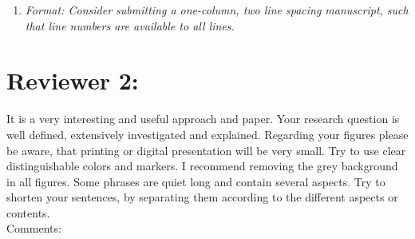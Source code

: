 \documentclass{article}
\begin{document}
\begin{enumerate}
  
  
    \answer{}
  
  \item \textit{Format: Consider submitting a one-column, two line spacing manuscript, such that line numbers are available to all lines.}
  
   
\end{enumerate} 
  

\section*{Reviewer 2:}

It is a very interesting and useful approach and paper. Your research question is well defined, extensively investigated and explained. Regarding your figures please be aware, that printing or digital presentation will be very small. Try to use clear distinguishable colors and markers. I recommend removing the grey background in all figures. Some phrases are quiet long and contain several aspects. Try to shorten your sentences, by separating them according to the different aspects or contents.\\

Comments:\\
\end{document}
